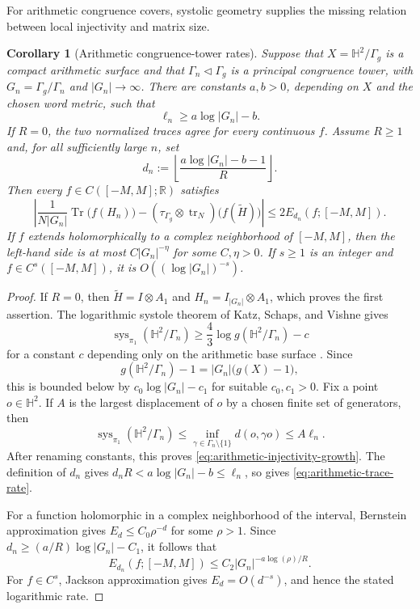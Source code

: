 \documentclass[11pt]{article}
\newtheorem{corollary}[theorem]{Corollary}
\theoremstyle{definition}
\theoremstyle{remark}
\newcommand{\HH}{\mathbb H}
\newcommand{\RR}{\mathbb R}
\newcommand{\Tr}{\operatorname{Tr}}
\newcommand{\tr}{\operatorname{tr}}
\begin{document}
For arithmetic congruence covers, systolic geometry supplies the missing
relation between local injectivity and matrix size.

\begin{corollary}[Arithmetic congruence-tower rates]
\label{cor:arithmetic-congruence-rate}
Suppose that \(X=\HH^2/\Gamma_g\) is a compact arithmetic surface and that
\(\Gamma_n\triangleleft\Gamma_g\) is a principal congruence tower, with
\(G_n=\Gamma_g/\Gamma_n\) and \(|G_n|\to\infty\).  There are constants
\(a,b>0\), depending on \(X\) and the chosen word metric, such that
\[
                    \ell_n\geq a\log|G_n|-b.
\tag{10.5c}\label{eq:arithmetic-injectivity-growth}
\]
If \(R=0\), the two normalized traces agree for every continuous \(f\).
Assume \(R\geq1\) and, for all sufficiently large \(n\), set
\[
 d_n:=\left\lfloor
          \frac{a\log|G_n|-b-1}{R}
       \right\rfloor .
\tag{10.5d}\label{eq:arithmetic-polynomial-degree}
\]
Then every \(f\in C([-M,M];\RR)\) satisfies
\[
\left|
 \frac{1}{N|G_n|}\Tr\!\bigl(f(H_n)\bigr)
 -
 (\tau_{\Gamma_g}\otimes\tr_N)\!\bigl(f(\widetilde H)\bigr)
\right|
 \leq 2E_{d_n}(f;[-M,M]).
\tag{10.5e}\label{eq:arithmetic-trace-rate}
\]
If \(f\) extends holomorphically to a complex neighborhood of \([-M,M]\),
then the left-hand side is at most \(C|G_n|^{-\eta}\) for some
\(C,\eta>0\).  If \(s\geq1\) is an integer and
\(f\in C^s([-M,M])\), it is
\(O((\log|G_n|)^{-s})\).
\end{corollary}

\begin{proof}
If \(R=0\), then \(\widetilde H=I\otimes A_1\) and
\(H_n=I_{|G_n|}\otimes A_1\), which proves the first assertion.
The logarithmic systole theorem of Katz, Schaps, and Vishne gives
\[
 \operatorname{sys}_{\pi_1}(\HH^2/\Gamma_n)
      \geq \frac43\log g(\HH^2/\Gamma_n)-c
\]
for a constant \(c\) depending only on the arithmetic base surface
\cite{KatzSchapsVishne2007}.  Since
\[
 g(\HH^2/\Gamma_n)-1
       =|G_n|\bigl(g(X)-1\bigr),
\]
this is bounded below by \(c_0\log|G_n|-c_1\) for suitable
\(c_0,c_1>0\).  Fix a point \(o\in\HH^2\).  If \(A\) is the largest
displacement of \(o\) by a chosen finite set of generators, then
\[
 \operatorname{sys}_{\pi_1}(\HH^2/\Gamma_n)
 \leq \inf_{\gamma\in\Gamma_n\setminus\{1\}}d(o,\gamma o)
 \leq A\ell_n.
\]
After renaming constants, this proves
\eqref{eq:arithmetic-injectivity-growth}.  The definition of \(d_n\) gives
\(d_nR<a\log|G_n|-b\leq\ell_n\), so
 gives
\eqref{eq:arithmetic-trace-rate}.

For a function holomorphic in a complex neighborhood of the interval,
Bernstein approximation gives \(E_d\leq C_0\rho^{-d}\) for some
\(\rho>1\).  Since \(d_n\geq (a/R)\log|G_n|-C_1\), it follows that
\[
 E_{d_n}(f;[-M,M])
    \leq C_2|G_n|^{-a\log(\rho)/R}.
\]
For \(f\in C^s\), Jackson approximation gives
\(E_d=O(d^{-s})\), and hence the stated logarithmic rate.
\end{proof}
\end{document}
